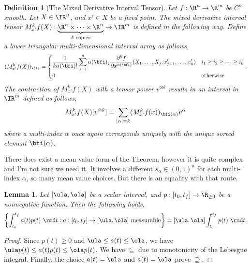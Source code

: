 \documentclass{article}
\theoremstyle{plain}
\newtheorem{lemma}{Lemma}
\newtheorem{definition}{Definition}
\theoremstyle{remark}
\begin{document}
\begin{definition}[The Mixed Derivative Interval Tensor]
Let $f:\R^n\to\R^m$ be $C^k$ smooth. 
Let $X\in\IR^n$, and $x'\in X$ be a fixed point. 
The \emph{mixed derivative interval tensor} $M^k_{x'}f(X) : \underbrace{\R^n \times \cdots \times \R^n}_{k\text{ copies}} \to \IR^m$ is defined in the following way.
Define a lower triangular multi-dimensional interval array as follows,
\begin{align*}
    (M^k_{x'}f (X))_{\bfi} = \begin{cases}
        \displaystyle \frac{1}{k\alpha(\bfi)!} \sum_{j=1}^n \alpha(\bfi)_j \frac{\partial^{k} f}{\partial x^{\alpha(\bfi)}} (X_1,\dots,X_j,x'_{j+1},\dots,x'_n) & i_1 \geq i_2 \geq \cdots \geq i_k \\
        0 & \text{otherwise}
    \end{cases}.
\end{align*}
The contraction of $M^k_{x'}f(X)$ with a tensor power $v^{\otimes k}$ results in an interval in $\IR^m$ defined as follows,
\begin{align*}
    M^k_{x'}f (X) [v^{\otimes k}] = \sum_{|\alpha| = k} (M^k_{x'}f(x))_{\bfi(\alpha)} v^\alpha
\end{align*}
where a multi-index $\alpha$ once again corresponds uniquely with the unique sorted element $\bfi(\alpha)$.
\end{definition}

There does exist a mean value form of the Theorem, however it is quite complex and I'm not sure we need it. 
It involves a different $s_\alpha\in(0,1)^n$ for each multi-index $\alpha$, so many mean value choices. But there is an equality with that route.

\begin{lemma} \label{lem:interval_integ}
Let $[\ula,\ola]$ be a scalar interval, and $p:[t_0,t_f]\to\R_{\geq0}$ be a nonnegative function. Then the following holds, 
\begin{align*}
    \left\{\int_{t_0}^{t_f} a(t) p(t) \ \rmd t : a:[t_0,t_f]\to[\ula,\ola] \text{ measurable} \right\} 
    = [\ula,\ola] \int_{t_0}^{t_f} p(t) \ \rmd t.
\end{align*}
\end{lemma}
\begin{proof}
Since $p(t)\geq 0$ and $\ula \leq a(t) \leq \ola$, we have $\ula p(t) \leq a(t)p(t) \leq \ola p(t)$.
We have $\subseteq$ due to monotonicity of the Lebesgue integral.
Finally, the choice $a(t) = \ula$ and $a(t) = \ola$ prove $\supseteq$.
\end{proof}
\end{document}
